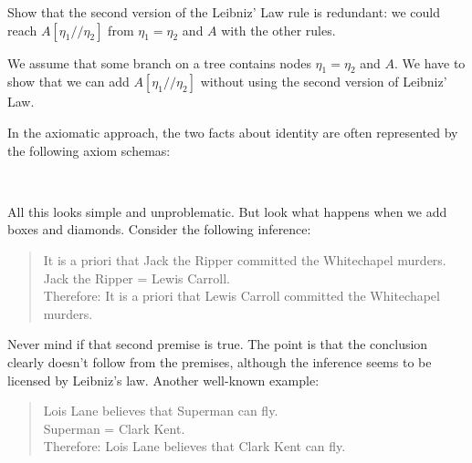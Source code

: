 \begin{exercise}
  Show that the second version of the Leibniz' Law rule is redundant: we could
  reach $A[\eta_1/\!/\eta_2]$ from $\eta_1=\eta_2$ and $A$ with the other rules.
\end{exercise}
\begin{solution}
  We assume that some branch on a tree contains nodes $\eta_1=\eta_2$ and $A$. We have to
  show that we can add $A[\eta_1/\!/\eta_2]$ without using the second version of Leibniz'
  Law.
\end{solution}

In the axiomatic approach, the two facts about identity are often represented by
the following axiom schemas:
%
\begin{principles}
  \\
\end{principles}

All this looks simple and unproblematic. But look what happens when we add boxes
and diamonds. Consider the following inference:
%
\begin{quote}
  It is a priori that Jack the Ripper committed the Whitechapel murders.\\
  Jack the Ripper = Lewis Carroll.\\
  Therefore: It is a priori that Lewis Carroll committed the Whitechapel murders.
\end{quote}
%
Never mind if that second premise is true. The point is that the conclusion
clearly doesn't follow from the premises, although the inference seems to be
licensed by Leibniz's law. Another well-known example:
%
\begin{quote}
  Lois Lane believes that Superman can fly.\\
  Superman = Clark Kent.\\
  Therefore: Lois Lane believes that Clark Kent can fly.
\end{quote}

